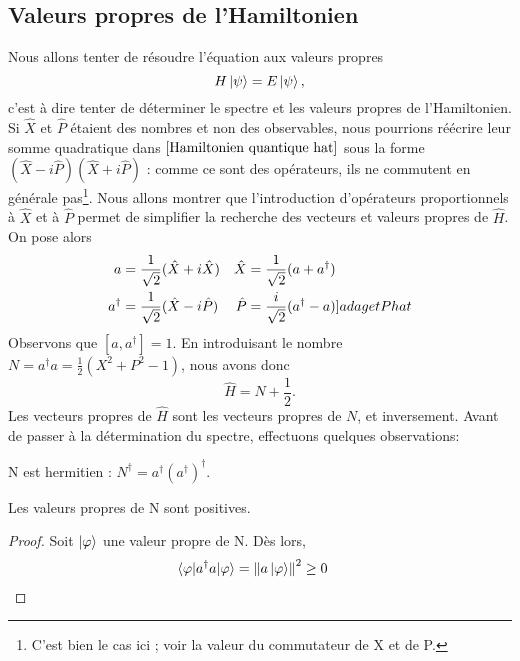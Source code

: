 \documentclass[../Notesdecours.tex]{subfiles}
\begin{document}
\subsection{Valeurs propres de l'Hamiltonien}
Nous allons tenter de résoudre l'équation aux valeurs propres 
\begin{equation}
    H\ket{\psi} = E\ket{\psi},
\end{equation}
c'est à dire tenter de déterminer le spectre et les valeurs propres de l'Hamiltonien.\\

Si $\hat{X}$ et $\hat{P}$ étaient des nombres et non des observables, nous pourrions réécrire leur somme quadratique dans $\eqref{Hamiltonien quantique hat}$ sous la forme $(\hat{X}-i\hat{P})(\hat{X}+i\hat{P})$ : comme ce sont des opérateurs, ils ne commutent en générale pas\footnote{C'est bien le cas ici ; voir la valeur du commutateur de X et de P.}. Nous allons montrer que l'introduction d'opérateurs proportionnels à $\hat{X}$ et à $\hat{P}$ permet de simplifier la recherche des vecteurs et valeurs propres de $\hat{H}$. On pose alors
\begin{align}
    a &= \frac{1}{\sqrt{2}}(\hat{X}+i\hat{X})   & \hat{X} &= \frac{1}{\sqrt{2}}(a+a^\dagger)\label{a et X hat}\\
    a^\dagger &= \frac{1}{\sqrt{2}}(\hat{X}-i\hat{P})    & \hat{P} &= \frac{i}{\sqrt{2}}(a^\dagger-a) \label[]{a dag et P hat}
\end{align}
Observons que $[a,a^\dagger] = 1$. En introduisant le nombre $N = a^\dagger a = \frac{1}{2}\left(X^2+P^2-1\right)$, nous avons donc
\begin{equation}
    \hat{H} = N+\frac{1}{2}.
\end{equation}
Les vecteurs propres de $\hat{H}$ sont les vecteurs propres de $N$, et inversement. Avant de passer à la détermination du spectre, effectuons quelques observations:
\begin{Property}
    N est hermitien : $N^\dagger = a^\dagger \left(a^\dagger\right)^\dagger$.
\end{Property}
\begin{Property}
    \label{N positif}
    Les valeurs propres de N sont positives.
\end{Property}
\begin{proof}
    Soit $\ket{\varphi}$ une valeur propre de N. Dès lors,
    \begin{align*}
        \braket{\varphi|a^\dagger a|\varphi} &= \norm{a\ket{\varphi}}^2 \geq 0
    \end{align*}
\end{proof}
\end{document}
